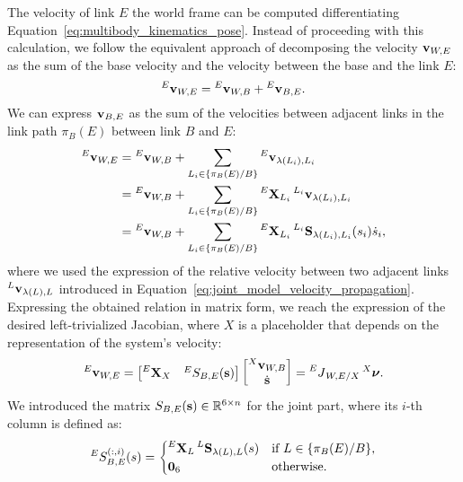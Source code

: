 The velocity of link $E$ \wrt the world frame can be computed differentiating Equation~\eqref{eq:multibody_kinematics_pose}.
Instead of proceeding with this calculation, we follow the equivalent approach of decomposing the velocity $\velsix_{W, E}$ as the sum of the base velocity and the velocity between the base and the link $E$:
%
\begin{equation*}
    \velsix[E]_{W,E} = \velsix[E]_{W,B} + \velsix[E]_{B,E}
    .
\end{equation*}
%
We can express $\velsix_{B, E}$ as the sum of the velocities between adjacent links in the link path $\pi_B(E)$ between link $B$ and $E$:
%
\begin{align*}
    \velsix[E]_{W,E}
    &= \velsix[E]_{W,B} + \sum_{L_i\in \{\pi_B(E) / B\}} \velsix[E]_{\lambda(L_i), L_i} \\
    &= \velsix[E]_{W,B} + \sum_{L_i\in \{\pi_B(E) / B\}} \transvel[E]_{L_i} \velsix[L_i]_{\lambda(L_i), L_i} \\
    &= \velsix[E]_{W,B} + \sum_{L_i\in \{\pi_B(E) / B\}} \transvel[E]_{L_i} \subspacee[L_i]_{\lambda(L_i), L_i}(\shape_i) \dot{\shape}_i
    ,
\end{align*}
%
where we used the expression of the relative velocity between two adjacent links $\velsix[L]_{\lambda(L),L}$ introduced in Equation~\eqref{eq:joint_model_velocity_propagation}.
Expressing the obtained relation in matrix form, we reach the expression of the desired left-trivialized Jacobian, where $X$ is a placeholder that depends on the representation of the system's velocity:
%
\begin{equation}
    \label{eq:jacobian_left_trivialized}
    \velsix[E]_{W,E} =
    \begin{bmatrix}
        \transvel[E]_X & {}^E S_{B,E}(\Shape)
    \end{bmatrix}
    \begin{bmatrix}
        \velsix[X]_{W,B} \\ \Shaped
    \end{bmatrix} =
    \jac[E]_{W,E/X} \Nu[X]
    .
\end{equation}
%
We introduced the matrix $S_{B,E}(\Shape) \in \realn^{6\times n}$ for the joint part, where its $i$-th column is defined as:
%
\begin{equation*}
    {}^E S_{B,E}^{(:,i)}(s) =
    \begin{cases}
        \transvel[E]_L \subspacee[L]_{\lambda(L), L}(\shape) &\text{if $L \in \{\pi_B(E) / B\}$,}\\
        \zeros_{6} &\text{otherwise.}
    \end{cases}
\end{equation*}

